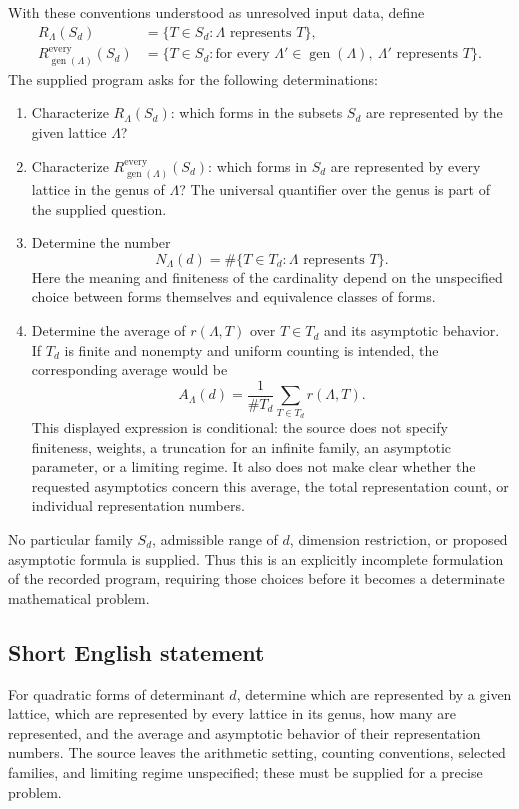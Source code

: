 \documentclass[11pt]{article}
\begin{document}
With these conventions understood as unresolved input data, define
\[
\begin{aligned}
R_{\Lambda}(S_d)
&=\{T\in S_d:\Lambda\text{ represents }T\},\\
R_{\operatorname{gen}(\Lambda)}^{\mathrm{every}}(S_d)
&=\{T\in S_d:\text{for every }\Lambda'\in\operatorname{gen}(\Lambda),\
\Lambda'\text{ represents }T\}.
\end{aligned}
\]
The supplied program asks for the following determinations:
\begin{enumerate}
\item Characterize \(R_{\Lambda}(S_d)\): which forms in the subsets \(S_d\) are represented by the given lattice \(\Lambda\)?
\item Characterize \(R_{\operatorname{gen}(\Lambda)}^{\mathrm{every}}(S_d)\): which forms in \(S_d\) are represented by every lattice in the genus of \(\Lambda\)? The universal quantifier over the genus is part of the supplied question.
\item Determine the number
\[
N_{\Lambda}(d)=\#\{T\in T_d:\Lambda\text{ represents }T\}.
\]
Here the meaning and finiteness of the cardinality depend on the unspecified choice between forms themselves and equivalence classes of forms.
\item Determine the average of \(r(\Lambda,T)\) over \(T\in T_d\) and its asymptotic behavior. If \(T_d\) is finite and nonempty and uniform counting is intended, the corresponding average would be
\[
A_{\Lambda}(d)=\frac{1}{\#T_d}\sum_{T\in T_d}r(\Lambda,T).
\]
This displayed expression is conditional: the source does not specify finiteness, weights, a truncation for an infinite family, an asymptotic parameter, or a limiting regime. It also does not make clear whether the requested asymptotics concern this average, the total representation count, or individual representation numbers.
\end{enumerate}
No particular family \(S_d\), admissible range of \(d\), dimension restriction, or proposed asymptotic formula is supplied. Thus this is an explicitly incomplete formulation of the recorded program, requiring those choices before it becomes a determinate mathematical problem.
\subsection{Short English statement}
For quadratic forms of determinant \(d\), determine which are represented by a given lattice, which are represented by every lattice in its genus, how many are represented, and the average and asymptotic behavior of their representation numbers. The source leaves the arithmetic setting, counting conventions, selected families, and limiting regime unspecified; these must be supplied for a precise problem.
\end{document}
